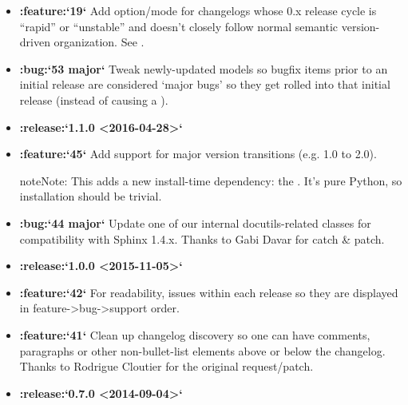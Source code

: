 \documentclass[letterpaper,10pt,english]{sphinxmanual}
\begin{document}
\begin{itemize}
\item {} 
{\color{red}\bfseries{}:feature:{}`19{}`} Add  option/mode for changelogs whose
0.x release cycle is “rapid” or “unstable” and doesn’t closely follow normal
semantic version-driven organization. See .

\item {} 
{\color{red}\bfseries{}:bug:{}`53 major{}`} Tweak newly-updated models so bugfix items prior to an
initial release are considered ‘major bugs’ so they get rolled into that
initial release (instead of causing a ).

\item {} 
{\color{red}\bfseries{}:release:{}`1.1.0 \textless{}2016-04-28\textgreater{}{}`}

\item {} 
{\color{red}\bfseries{}:feature:{}`45{}`} Add support for major version transitions (e.g. 1.0 to 2.0).

\begin{sphinxadmonition}{note}{Note:}
This adds a new install-time dependency: the . It’s pure Python, so
installation should be trivial.
\end{sphinxadmonition}

\item {} 
{\color{red}\bfseries{}:bug:{}`44 major{}`} Update one of our internal docutils-related classes for
compatibility with Sphinx 1.4.x. Thanks to Gabi Davar for catch \& patch.

\item {} 
{\color{red}\bfseries{}:release:{}`1.0.0 \textless{}2015-11-05\textgreater{}{}`}

\item {} 
{\color{red}\bfseries{}:feature:{}`42{}`} For readability, issues within each release so they are
displayed in feature-\textgreater{}bug-\textgreater{}support order.

\item {} 
{\color{red}\bfseries{}:feature:{}`41{}`} Clean up changelog discovery so one can have comments,
paragraphs or other non-bullet-list elements above or below the changelog.
Thanks to Rodrigue Cloutier for the original request/patch.

\item {} 
{\color{red}\bfseries{}:release:{}`0.7.0 \textless{}2014-09-04\textgreater{}{}`}


\end{itemize}
\end{document}

